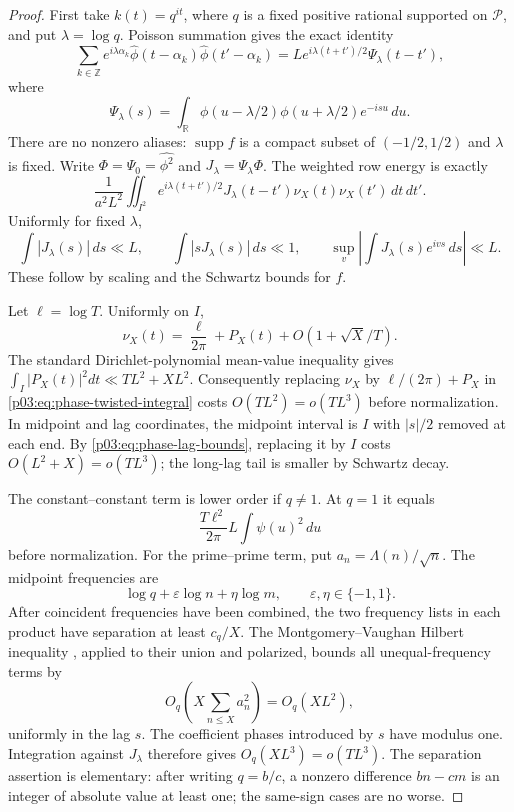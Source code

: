 \documentclass[11pt,letterpaper]{article}
\theoremstyle{definition}
\theoremstyle{remark}
\newcommand{\R}{\mathbb R}
\newcommand{\Z}{\mathbb Z}
\newcommand{\1}{\mathbf 1}
\begin{document}
\begin{proof}
First take $k(t)=q^{it}$, where $q$ is a fixed positive rational
supported on $\mathcal P$, and put $\lambda=\log q$. Poisson
summation gives the exact identity
\begin{equation}\label{p03:eq:phase-weighted-Poisson}
 \sum_{k\in\Z}e^{i\lambda\alpha_k}
   \widehat\phi(t-\alpha_k)\widehat\phi(t'-\alpha_k)
 =Le^{i\lambda(t+t')/2}\Psi_\lambda(t-t'),
\end{equation}
where
\[
 \Psi_\lambda(s)=\int_{\R}
    \phi(u-\lambda/2)\phi(u+\lambda/2)e^{-isu}\,du.
\]
There are no nonzero aliases: $\operatorname{supp}f$ is a compact
subset of $(-1/2,1/2)$ and $\lambda$ is fixed. Write
$\Phi=\Psi_0=\widehat{\phi^2}$ and
$J_\lambda=\Psi_\lambda\Phi$. The weighted row energy is exactly
\begin{equation}\label{p03:eq:phase-twisted-integral}
 \frac1{a^2L^2}\iint_{I^2}
 e^{i\lambda(t+t')/2}J_\lambda(t-t')
                  \nu_X(t)\nu_X(t')\,dt\,dt'.
\end{equation}
Uniformly for fixed $\lambda$,
\begin{equation}\label{p03:eq:phase-lag-bounds}
 \int|J_\lambda(s)|\,ds\ll L,\qquad
 \int|sJ_\lambda(s)|\,ds\ll1,\qquad
 \sup_v\left|\int J_\lambda(s)e^{ivs}\,ds\right|\ll L.
\end{equation}
These follow by scaling and the Schwartz bounds for $f$.

Let $\ell=\log T$. Uniformly on $I$,
\[
 \nu_X(t)=\frac\ell{2\pi}+P_X(t)
                         +O(1+\sqrt X/T).
\]
The standard Dirichlet-polynomial mean-value inequality gives
$\int_I|P_X(t)|^2dt\ll TL^2+XL^2$. Consequently replacing
$\nu_X$ by $\ell/(2\pi)+P_X$ in
\eqref{p03:eq:phase-twisted-integral} costs $O(TL^2)=o(TL^3)$ before
normalization. In midpoint and lag coordinates, the midpoint interval
is $I$ with $|s|/2$ removed at each end. By
\eqref{p03:eq:phase-lag-bounds}, replacing it by $I$ costs
$O(L^2+X)=o(TL^3)$; the long-lag tail is smaller by Schwartz decay.

The constant--constant term is lower order if $q\ne1$. At $q=1$
it equals
\[
 \frac{T\ell^2}{2\pi}L\int\psi(u)^2\,du
\]
before normalization. For the prime--prime term, put
$a_n=\Lambda(n)/\sqrt n$. The midpoint frequencies are
\[
 \log q+\varepsilon\log n+\eta\log m,
                 \qquad \varepsilon,\eta\in\{-1,1\}.
\]
After coincident frequencies have been combined, the two frequency
lists in each product have separation at least $c_q/X$. The
Montgomery--Vaughan Hilbert inequality \cite{Hilbert}, applied to their union and
polarized, bounds all unequal-frequency terms by
\[
 O_q\left(X\sum_{n\le X}a_n^2\right)=O_q(XL^2),
\]
uniformly in the lag $s$. The coefficient phases introduced by $s$
have modulus one. Integration against $J_\lambda$ therefore gives
$O_q(XL^3)=o(TL^3)$. The separation assertion is elementary: after
writing $q=b/c$, a nonzero difference $bn-cm$ is an integer of
absolute value at least one; the same-sign cases are no worse.


\end{proof}
\end{document}
